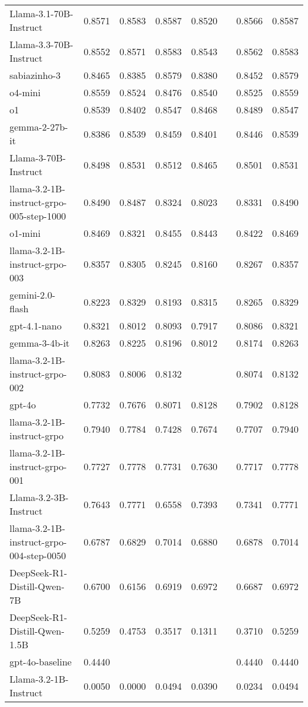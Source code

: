 \begin{longtable}{lrllllrr}
Llama-3.1-70B-Instruct & 0.8571 & 0.8583 & 0.8587 & 0.8520 &  & 0.8566 & 0.8587 \\
Llama-3.3-70B-Instruct & 0.8552 & 0.8571 & 0.8583 & 0.8543 &  & 0.8562 & 0.8583 \\
sabiazinho-3 & 0.8465 & 0.8385 & 0.8579 & 0.8380 &  & 0.8452 & 0.8579 \\
o4-mini & 0.8559 & 0.8524 & 0.8476 & 0.8540 &  & 0.8525 & 0.8559 \\
o1 & 0.8539 & 0.8402 & 0.8547 & 0.8468 &  & 0.8489 & 0.8547 \\
gemma-2-27b-it & 0.8386 & 0.8539 & 0.8459 & 0.8401 &  & 0.8446 & 0.8539 \\
Llama-3-70B-Instruct & 0.8498 & 0.8531 & 0.8512 & 0.8465 &  & 0.8501 & 0.8531 \\
llama-3.2-1B-instruct-grpo-005-step-1000 & 0.8490 & 0.8487 & 0.8324 & 0.8023 &  & 0.8331 & 0.8490 \\
o1-mini & 0.8469 & 0.8321 & 0.8455 & 0.8443 &  & 0.8422 & 0.8469 \\
llama-3.2-1B-instruct-grpo-003 & 0.8357 & 0.8305 & 0.8245 & 0.8160 &  & 0.8267 & 0.8357 \\
gemini-2.0-flash & 0.8223 & 0.8329 & 0.8193 & 0.8315 &  & 0.8265 & 0.8329 \\
gpt-4.1-nano & 0.8321 & 0.8012 & 0.8093 & 0.7917 &  & 0.8086 & 0.8321 \\
gemma-3-4b-it & 0.8263 & 0.8225 & 0.8196 & 0.8012 &  & 0.8174 & 0.8263 \\
llama-3.2-1B-instruct-grpo-002 & 0.8083 & 0.8006 & 0.8132 &  &  & 0.8074 & 0.8132 \\
gpt-4o & 0.7732 & 0.7676 & 0.8071 & 0.8128 &  & 0.7902 & 0.8128 \\
llama-3.2-1B-instruct-grpo & 0.7940 & 0.7784 & 0.7428 & 0.7674 &  & 0.7707 & 0.7940 \\
llama-3.2-1B-instruct-grpo-001 & 0.7727 & 0.7778 & 0.7731 & 0.7630 &  & 0.7717 & 0.7778 \\
Llama-3.2-3B-Instruct & 0.7643 & 0.7771 & 0.6558 & 0.7393 &  & 0.7341 & 0.7771 \\
llama-3.2-1B-instruct-grpo-004-step-0050 & 0.6787 & 0.6829 & 0.7014 & 0.6880 &  & 0.6878 & 0.7014 \\
DeepSeek-R1-Distill-Qwen-7B & 0.6700 & 0.6156 & 0.6919 & 0.6972 &  & 0.6687 & 0.6972 \\
DeepSeek-R1-Distill-Qwen-1.5B & 0.5259 & 0.4753 & 0.3517 & 0.1311 &  & 0.3710 & 0.5259 \\
gpt-4o-baseline & 0.4440 &  &  &  &  & 0.4440 & 0.4440 \\
Llama-3.2-1B-Instruct & 0.0050 & 0.0000 & 0.0494 & 0.0390 &  & 0.0234 & 0.0494 \\
\end{longtable}
